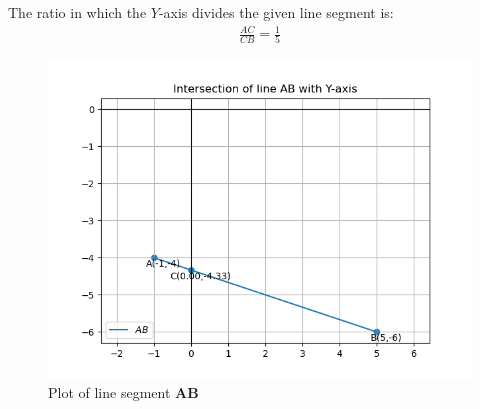 \documentclass[journal]{IEEEtran}
\begin{document}
The ratio in which the $Y$-axis divides the given line segment is:\\
\begin{align}
    {\frac{AC}{CB}}=\frac{1}{5}
\end{align}
\begin{figure}[h!]
   \centering
   \includegraphics[width=0.7\linewidth]{figs/plot.png}
   \caption{Plot of line segment \textbf{AB}}
   \label{}
\end{figure}
\end{document}
